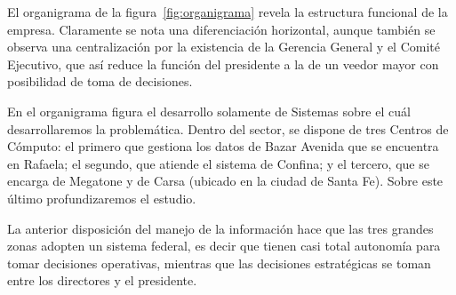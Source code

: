 
El organigrama de la figura~\ref{fig:organigrama} revela la estructura
funcional de la empresa.  Claramente se nota una diferenciación horizontal,
aunque también se observa una centralización  por la existencia de la Gerencia
General y el Comité Ejecutivo, que así reduce la función del presidente a la de
un veedor mayor con posibilidad de toma de decisiones.

En el organigrama figura el desarrollo solamente de Sistemas sobre el cuál
desarrollaremos la problemática. Dentro del sector, se dispone de tres Centros
de Cómputo: el primero que gestiona los datos de Bazar Avenida que se encuentra
en Rafaela; el segundo, que atiende el sistema de Confina; y el tercero, que se
encarga de Megatone y de Carsa (ubicado en la ciudad de Santa Fe). Sobre este
último profundizaremos el estudio.

La anterior disposición del manejo de la información hace que las tres grandes
zonas adopten un sistema federal, es decir que tienen casi total autonomía para
tomar decisiones operativas, mientras que las decisiones estratégicas se toman
entre los directores y el presidente.


